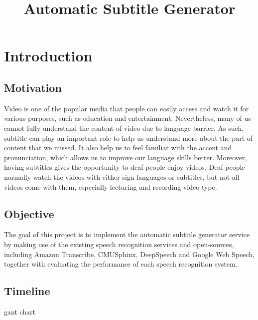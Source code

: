 \documentclass[natbib]{muthesis}
\title{Automatic Subtitle Generator}
\begin{document}
  \maketitle


  \abstract{
  	
  }

  \tableofcontents


  \chapter{Introduction}
  \section{Motivation}
  Video is one of the popular media that people can easily access and watch it for various purposes, such as education and entertainment. Nevertheless, many of us cannot fully understand the content of video due to language barrier. As such, subtitle can play an important role to help us understand more about the part of content that we missed. It also help us to feel familiar with the accent and pronunciation, which allows us to improve our language skills better. Moreover, having subtitles gives the opportunity to deaf people enjoy videos. Deaf people normally watch the videos with either sign languages or subtitles, but not all videos come with them, especially lecturing and recording video type. 
  
  \section{Objective}
  The goal of this project is to implement the automatic subtitle generator service by making use of the existing speech recognition services and open-sources, including Amazon Transcribe, CMUSphinx, DeepSpeech and Google Web Speech, together with evaluating the performance of each speech recognition system.
  
  \section{Timeline}
  gant chart
  
\end{document}
